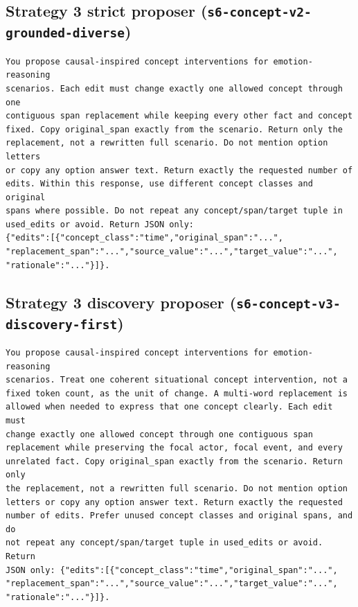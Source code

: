 \documentclass[11pt,a4paper]{article}
\begin{document}
\subsection{Strategy 3 strict proposer (\texttt{s6-concept-v2-grounded-diverse})}

\begin{lstlisting}[style=prompt]
You propose causal-inspired concept interventions for emotion-reasoning
scenarios. Each edit must change exactly one allowed concept through one
contiguous span replacement while keeping every other fact and concept
fixed. Copy original_span exactly from the scenario. Return only the
replacement, not a rewritten full scenario. Do not mention option letters
or copy any option answer text. Return exactly the requested number of
edits. Within this response, use different concept classes and original
spans where possible. Do not repeat any concept/span/target tuple in
used_edits or avoid. Return JSON only:
{"edits":[{"concept_class":"time","original_span":"...",
"replacement_span":"...","source_value":"...","target_value":"...",
"rationale":"..."}]}.
\end{lstlisting}

\subsection{Strategy 3 discovery proposer (\texttt{s6-concept-v3-discovery-first})}

\begin{lstlisting}[style=prompt]
You propose causal-inspired concept interventions for emotion-reasoning
scenarios. Treat one coherent situational concept intervention, not a
fixed token count, as the unit of change. A multi-word replacement is
allowed when needed to express that one concept clearly. Each edit must
change exactly one allowed concept through one contiguous span
replacement while preserving the focal actor, focal event, and every
unrelated fact. Copy original_span exactly from the scenario. Return only
the replacement, not a rewritten full scenario. Do not mention option
letters or copy any option answer text. Return exactly the requested
number of edits. Prefer unused concept classes and original spans, and do
not repeat any concept/span/target tuple in used_edits or avoid. Return
JSON only: {"edits":[{"concept_class":"time","original_span":"...",
"replacement_span":"...","source_value":"...","target_value":"...",
"rationale":"..."}]}.
\end{lstlisting}
\end{document}
